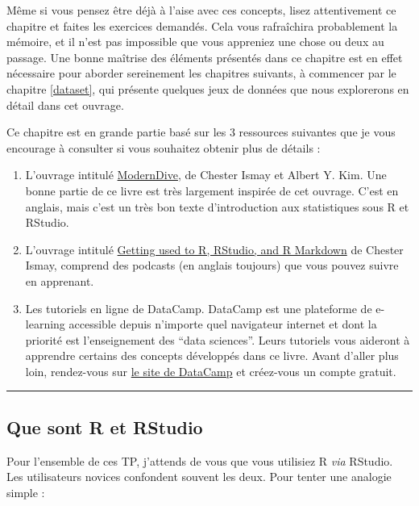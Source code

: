 \documentclass[
  a4paper,
]{article}
\providecommand{\tightlist}{%
  \setlength{\itemsep}{0pt}\setlength{\parskip}{0pt}}
\begin{document}
Même si vous pensez être déjà à l'aise avec ces concepts, lisez attentivement ce chapitre et faites les exercices demandés. Cela vous rafraîchira probablement la mémoire, et il n'est pas impossible que vous appreniez une chose ou deux au passage. Une bonne maîtrise des éléments présentés dans ce chapitre est en effet nécessaire pour aborder sereinement les chapitres suivants, à commencer par le chapitre \ref{dataset}, qui présente quelques jeux de données que nous explorerons en détail dans cet ouvrage.

Ce chapitre est en grande partie basé sur les 3 ressources suivantes que je vous encourage à consulter si vous souhaitez obtenir plus de détails :

\begin{enumerate}
\def\labelenumi{\arabic{enumi}.}
\tightlist
\item
  L'ouvrage intitulé \href{https://moderndive.com/index.html}{ModernDive}, de Chester Ismay et Albert Y. Kim. Une bonne partie de ce livre est très largement inspirée de cet ouvrage. C'est en anglais, mais c'est un très bon texte d'introduction aux statistiques sous R et RStudio.
\item
  L'ouvrage intitulé \href{https://ismayc.github.io/rbasics-book/}{Getting used to R, RStudio, and R Markdown} de Chester Ismay, comprend des podcasts (en anglais toujours) que vous pouvez suivre en apprenant.
\item
  Les tutoriels en ligne de DataCamp. DataCamp est une plateforme de e-learning accessible depuis n'importe quel navigateur internet et dont la priorité est l'enseignement des ``data sciences''. Leurs tutoriels vous aideront à apprendre certains des concepts développés dans ce livre. Avant d'aller plus loin, rendez-vous sur \href{https://www.datacamp.com/}{le site de DataCamp} et créez-vous un compte gratuit.
\end{enumerate}

\begin{center}\rule{0.5\linewidth}{0.5pt}\end{center}

\hypertarget{que-sont-r-et-rstudio}{%
\subsection{Que sont R et RStudio}\label{que-sont-r-et-rstudio}}

Pour l'ensemble de ces TP, j'attends de vous que vous utilisiez R \emph{via} RStudio. Les utilisateurs novices confondent souvent les deux. Pour tenter une analogie simple :
\end{document}
